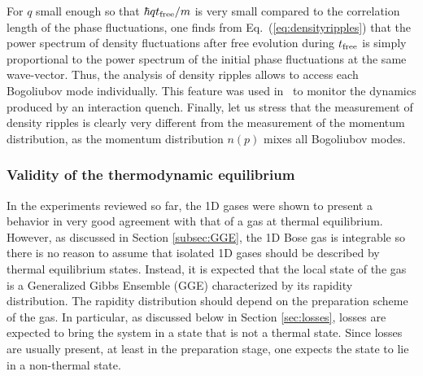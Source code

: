 \documentclass[onecolumn,amsfonts,showpacs,superscriptaddress]{revtex4-1}
\begin{document}
For $q$ small enough so that $\hbar q t_{{\rm free}}/m$ is very small compared to the correlation length of the phase fluctuations, one finds from Eq.~(\ref{eq:densityripples})
that the power spectrum of density fluctuations after free evolution during $t_{{\rm free}}$ is simply proportional to the power spectrum of the initial phase fluctuations at the same wave-vector. Thus, the analysis of density ripples allows to access each Bogoliubov mode individually.
This feature was used in~\citep{schemmer_monitoring_2018}
to monitor the dynamics produced by an interaction quench.
Finally, let us stress that the measurement of density ripples is clearly very different from the measurement of the momentum distribution, as the momentum distribution $n(p)$ mixes all  Bogoliubov modes. 





\subsubsection{Validity of the thermodynamic equilibrium}
In the experiments reviewed so far, the 1D gases were shown to present a behavior in very
good agreement with that of a gas at thermal equilibrium.
However, as discussed in Section \ref{subsec:GGE}, the 1D Bose gas is integrable so there is no reason to assume that isolated 1D gases should be described by thermal equilibrium states. Instead,
it is expected that the local state of the gas is a Generalized Gibbs Ensemble (GGE) characterized by its rapidity distribution. The rapidity
distribution should depend on the preparation scheme of the gas. In particular, as discussed below in Section
\ref{sec:losses}, losses are expected to bring the system in a state that is not a thermal state. Since losses are usually present, at least in the preparation stage, one expects the state to lie in a non-thermal state.
\end{document}
